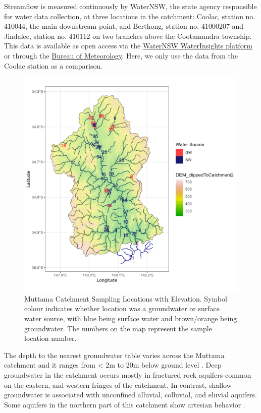 \documentclass[, manuscript]{copernicus}
\begin{document}
Streamflow is measured continuously by WaterNSW, the state agency
responsible for water data collection, at three locations in the
catchment: Coolac, station no. 410044, the main downstream point, and
Berthong, station no. 41000207 and Jindalee, station no. 410112 on two
branches above the Cootamundra township. This data is available as open
access via the \href{https://waterinsights.waternsw.com.au/}{WaterNSW
WaterInsights platform} or through the
\href{http://bom.gov.au/waterdata/}{Bureau of Meteorology}. Here, we
only use the data from the Coolac station as a comparison.

\begin{figure}
\includegraphics[width=0.8\linewidth]{Figures/gw_or_sw_map} \caption{Muttama Catchment Sampling Locations with Elevation. Symbol colour indicates whether location was a groundwater or surface water source, with blue being surface water and brown/orange being groundwater. The numbers on the map represent the sample location number.}\label{fig:samplemap}
\end{figure}

The depth to the nearest groundwater table varies across the Muttama
catchment and it ranges from \textless{} 2m to 20m below ground level
\citep{DECC2009}. Deep groundwater in the catchment occurs mostly in
fractured rock aquifers common on the eastern, and western fringes of
the catchment. In contrast, shallow groundwater is associated with
unconfined alluvial, colluvial, and eluvial aquifers. Some aquifers in
the northern part of this catchment show artesian behavior
\citep{Webb1999, Akter2018}.
\end{document}
